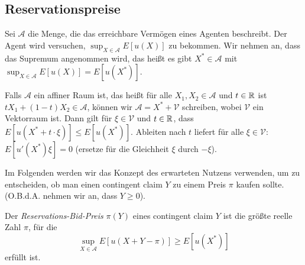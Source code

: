 \documentclass[a4paper,twoside,DIV15,BCOR12mm]{scrbook}
\newcommand{\cA}{\mathcal A}
\newcommand{\cV}{\mathcal V}
\begin{document}
\subsection{Reservationspreise}

Sei $\cA$ die Menge, die das erreichbare Vermögen eines Agenten beschreibt. Der Agent wird versuchen, $\sup_{X\in\cA}E[u(X)]$ zu bekommen. Wir nehmen an, dass das Supremum angenommen wird, das heißt es gibt $X^*\in\cA$ mit $\sup_{X\in\cA}E[u(X)] = E[u(X^*)]$.

Falls $\cA$ ein affiner Raum ist, das heißt für alle $X_1,X_2\in \cA$ und $t\in\mathbb{R}$ ist $tX_1 + (1-t)X_2 \in \cA$, können wir $\cA = X^* + \cV$ schreiben, wobei $\cV$ ein Vektorraum ist. Dann gilt für $\xi\in\cV$ und $t\in \mathbb{R}$, dass $E[u(X^* + t\cdot\xi)] \le E[u(X^*)]$. Ableiten nach $t$ liefert für alle $\xi\in\cV$: $E[u'(X^*)\xi]=0$ (ersetze für die Gleichheit $\xi$ durch $-\xi$).

Im Folgenden werden wir das Konzept des erwarteten Nutzens verwenden, um zu entscheiden, ob man einen contingent claim $Y$ zu einem Preis $\pi$ kaufen sollte. (O.B.d.A. nehmen wir an, dass $Y\ge 0$).

\begin{definition}
Der \emph{Reservations-Bid-Preis} $\pi(Y)$ eines contingent claim $Y$ ist die größte reelle Zahl $\pi$, für die \[\sup_{X\in\cA} E[u(X+Y-\pi)] \ge E[u(X^*)]\] erfüllt ist.
\end{definition}
\end{document}
